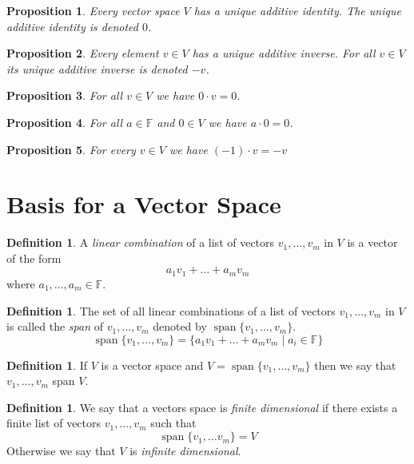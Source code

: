 \documentclass[12pt,letterpaper]{article}
\renewcommand{\span}{\operatorname {span}}
\theoremstyle{plain}
\newtheorem{proposition}{Proposition}[section]
\theoremstyle{definition}
\newtheorem{definition}[theorem]{Definition}
\numberwithin{equation}{section}
\begin{document}
\begin{proposition}Every vector space $V$ has a unique additive identity. The unique additive identity is denoted $0$. 
\end{proposition}

\begin{proposition}Every element $v\in V$ has a unique additive inverse. For all $v\in V$ its unique additive inverse is denoted $-v$. 
\end{proposition}

\begin{proposition}For all $v\in V$ we have $0\cdot v=0$. 
\end{proposition}

\begin{proposition}For all $a\in \mathbb{F}$ and $0\in V$ we have $a\cdot 0=0$.
\end{proposition}

\begin{proposition}For every $v\in V$ we have $(-1)\cdot v=-v$
\end{proposition}

\section{Basis for a Vector Space}

\begin{definition} A \emph{linear combination} of a list of vectors $v_1,\ldots, v_m$ in $V$ is a vector of the form 
\[a_1v_1+\ldots+a_mv_m\]
where $a_1,\ldots, a_m\in \mathbb{F}$. 
\end{definition}

\begin{definition} The set of all linear combinations of a list of vectors $v_1, \ldots, v_m$ in $V$ is called the \emph{span} of $v_1, \ldots,v_m$ denoted by 
$\span\{v_1,\ldots,v_m\}$.
\[\span\{v_1,\ldots,v_m\}=\{a_1v_1+\ldots+a_mv_m\mid a_i\in \mathbb{F}\}\]
\end{definition}

\begin{definition} If $V$ is a vector space and $V=\span\{v_1,\ldots,v_m\}$ then we say that $v_1, \ldots, v_m$ span $V$. 
\end{definition}

\begin{definition} We say that a vectors space is \emph{finite dimensional} if there exists a finite list of vectors $v_1,\ldots, v_m$ such that 
\[\span\{v_1,\ldots v_m\}=V\] 
Otherwise we say that $V$ is \emph{infinite dimensional}.
\end{definition}
\end{document}

